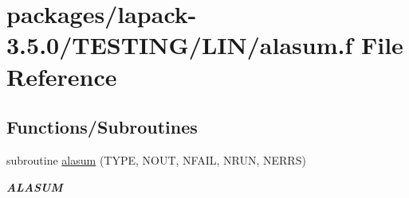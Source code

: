 \hypertarget{LIN_2alasum_8f}{}\section{packages/lapack-\/3.5.0/\+T\+E\+S\+T\+I\+N\+G/\+L\+I\+N/alasum.f File Reference}
\label{LIN_2alasum_8f}
\subsection*{Functions/\+Subroutines}
\begin{DoxyCompactItemize}
\item 
subroutine \hyperlink{group__aux__lin_gad56ccbe8939c1230b917e03bf7b722b7}{alasum} (T\+Y\+P\+E, N\+O\+U\+T, N\+F\+A\+I\+L, N\+R\+U\+N, N\+E\+R\+R\+S)
\begin{DoxyCompactList}\small\item\em {\bfseries A\+L\+A\+S\+U\+M} \end{DoxyCompactList}\end{DoxyCompactItemize}

